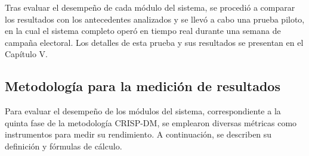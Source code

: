 \documentclass[listof=nochaptergap,12pt,times,authoryear]{report}
\begin{document}
Tras evaluar el desempeño de cada módulo del sistema, se procedió a comparar los resultados con los antecedentes analizados y se llevó a cabo una prueba piloto, en la cual el sistema completo operó en tiempo real durante una semana de campaña electoral. Los detalles de esta prueba y sus resultados se presentan en el Capítulo V.
 
\subsection{Metodología para la medición de resultados}
 
Para evaluar el desempeño de los módulos del sistema, correspondiente a la quinta fase de la metodología CRISP-DM, se emplearon diversas métricas como instrumentos para medir su rendimiento. A continuación, se describen su definición y fórmulas de cálculo.
 
\end{document}
